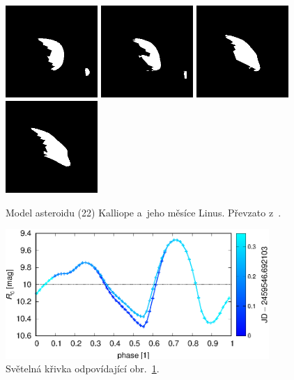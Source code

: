\documentclass[11pt]{article}
\begin{document}
\begin{figure}[p]
\includegraphics[width=3.5cm]{figs/22_test48_update2/output.0013.syn.png}
\includegraphics[width=3.5cm]{figs/22_test48_update2/output.0014.syn.png}
\includegraphics[width=3.5cm]{figs/22_test48_update2/output.0015.syn.png}
\includegraphics[width=3.5cm]{figs/22_test48_update2/output.0016.syn.png}
\caption{
Model asteroidu (22) Kalliope a~jeho měsíce Linus.
Převzato z~\cite{Broz_2023A&A...676A..60B}.
}
\label{22_test48_update2_output.0001.syn}
\end{figure}


\begin{figure}
\centering
\includegraphics[width=10cm]{figs/22_test48_update2/chi2_LC2_PHASE.eps}
\caption{
Světelná křivka odpovídající obr.~\ref{22_test48_update2_output.0001.syn}.}
\label{22_test48_update2_chi2_LC2_PHASE}
\end{figure}
\end{document}
